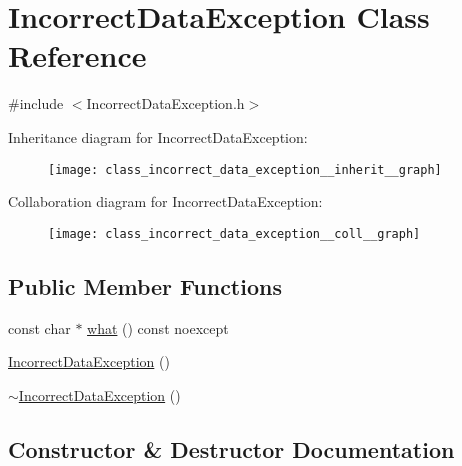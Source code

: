 \hypertarget{class_incorrect_data_exception}{}\section{Incorrect\+Data\+Exception Class Reference}
\label{class_incorrect_data_exception}


{\ttfamily \#include $<$Incorrect\+Data\+Exception.\+h$>$}



Inheritance diagram for Incorrect\+Data\+Exception\+:
\nopagebreak
\begin{figure}[H]
\begin{center}
\leavevmode
\texttt{[image: class\_incorrect\_data\_exception\_\_inherit\_\_graph]}
\end{center}
\end{figure}


Collaboration diagram for Incorrect\+Data\+Exception\+:
\nopagebreak
\begin{figure}[H]
\begin{center}
\leavevmode
\texttt{[image: class\_incorrect\_data\_exception\_\_coll\_\_graph]}
\end{center}
\end{figure}
\subsection*{Public Member Functions}
\begin{DoxyCompactItemize}
\item 
const char $\ast$ \mbox{\hyperlink{class_incorrect_data_exception_a362f99afc2cbd57a8a049f230958403b}{what}} () const noexcept
\item 
\mbox{\hyperlink{class_incorrect_data_exception_a2ea43b39eedd177c79bee3d109e550dc}{Incorrect\+Data\+Exception}} ()
\item 
\mbox{\hyperlink{class_incorrect_data_exception_a264ea44c51ba32e5ce1b5c04d365ffb7}{$\sim$\+Incorrect\+Data\+Exception}} ()
\end{DoxyCompactItemize}


\subsection{Constructor \& Destructor Documentation}
\mbox{\label{class_incorrect_data_exception_a2ea43b39eedd177c79bee3d109e550dc}} 

